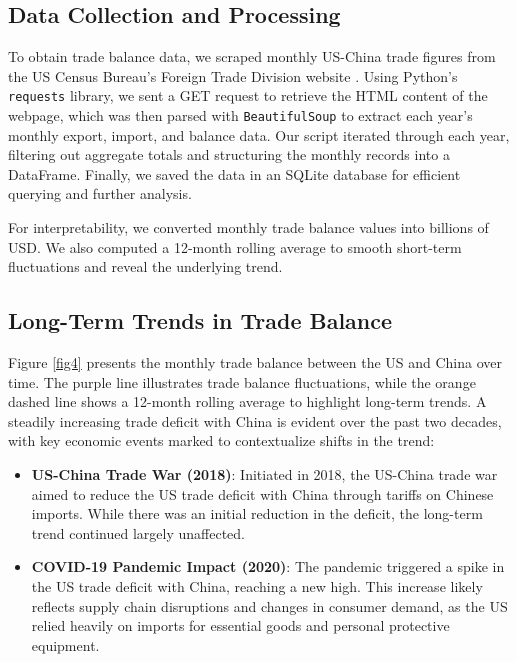 \documentclass{article}
\begin{document}
\subsection{Data Collection and Processing}

To obtain trade balance data, we scraped monthly US-China trade figures from the US Census Bureau’s Foreign Trade Division website \cite{census}. Using Python’s \texttt{requests} library, we sent a GET request to retrieve the HTML content of the webpage, which was then parsed with \texttt{BeautifulSoup} to extract each year’s monthly export, import, and balance data. Our script iterated through each year, filtering out aggregate totals and structuring the monthly records into a DataFrame. Finally, we saved the data in an SQLite database for efficient querying and further analysis.

For interpretability, we converted monthly trade balance values into billions of USD. We also computed a 12-month rolling average to smooth short-term fluctuations and reveal the underlying trend.

\subsection{Long-Term Trends in Trade Balance}

Figure \ref{fig4} presents the monthly trade balance between the US and China over time. The purple line illustrates trade balance fluctuations, while the orange dashed line shows a 12-month rolling average to highlight long-term trends. A steadily increasing trade deficit with China is evident over the past two decades, with key economic events marked to contextualize shifts in the trend:

\begin{itemize}
    \item \textbf{US-China Trade War (2018)}: Initiated in 2018, the US-China trade war aimed to reduce the US trade deficit with China through tariffs on Chinese imports. While there was an initial reduction in the deficit, the long-term trend continued largely unaffected.
    \item \textbf{COVID-19 Pandemic Impact (2020)}: The pandemic triggered a spike in the US trade deficit with China, reaching a new high. This increase likely reflects supply chain disruptions and changes in consumer demand, as the US relied heavily on imports for essential goods and personal protective equipment.
\end{itemize}
\end{document}
